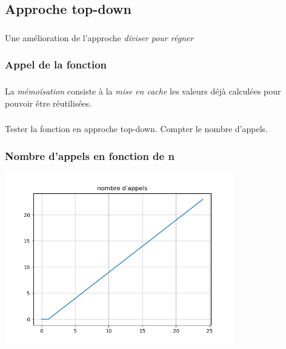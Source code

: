 \documentclass[svgnames,11pt]{beamer}
\begin{document}
\subsection{Approche top-down}
\begin{frame}
    \frametitle{}

    Une amélioration de l'approche \emph{diviser pour régner}

\end{frame}
\begin{frame}
    \frametitle{}

    

\end{frame}
\begin{frame}
    \frametitle{Appel de la fonction}
    
\end{frame}
\begin{frame}
    \frametitle{}

    \begin{aretenir}[]
        La \emph{mémoïsation} consiste à la \emph{mise en cache} les valeurs déjà calculées pour pouvoir être réutilisées.
    \end{aretenir}

\end{frame}

\begin{frame}
    \frametitle{}

    \begin{activite}
        Tester la fonction en approche top-down. Compter le nombre d'appels.
    \end{activite}

\end{frame}
\begin{frame}
    \frametitle{Nombre d'appels en fonction de n}

    \begin{center}
        \centering
        \includegraphics[width=10cm]{ressources/nb-appels-dyn.png}
        \label{IMG}
    \end{center}

\end{frame}
\end{document}
